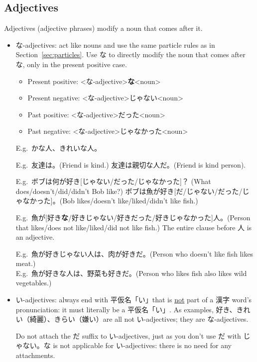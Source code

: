 \documentclass[../nihongo-gakushuu-kyouzai.tex]{subfiles}
\begin{document}
\subsection{Adjectives}
Adjectives (adjective phrases) modify a noun that comes after it.
\begin{itemize}
    \item な-adjectives: act like nouns and use the same particle rules as in Section~\ref{sec:particles}. Use な to directly modify the noun that comes after な, only in the present positive case.

    \begin{itemize}
        \item Present positive: <な-adjective>\textbf{な}<noun>
        \item Present negative: <な-adjective>じゃない<noun>
        \item Past positive: <な-adjective>だった<noun>
        \item Past negative: <な-adjective>じゃなかった<noun>
    \end{itemize}

    E.g.\ かな人、きれいな人。

    E.g.\ 友達は。(Friend is kind.) 友達は親切な人だ。(Friend is kind person).

    E.g.\ ボブは何が好き[じゃない/だった/じゃなかった]？ (What does/doesn't/did/didn't Bob like?) ボブは魚が好き[だ/じゃない/だった/じゃなかった]。(Bob likes/doesn't like/liked/didn't like fish.)

    E.g.\ 魚が[好き\textbf{な}/好きじゃない/好きだった/好きじゃなかった]人。(Person that likes/does not like/liked/did not like fish.) The entire clause before 人 is an adjective.

    E.g.\ 魚が好きじゃない人は、肉が好きだ。(Person who doesn't like fish likes meat.)\\
    E.g.\ 魚が好きな人は、野菜も好きだ。(Person who likes fish also likes wild vegetables.)

    \item い-adjectives: always end with 平仮名「い」that is \ul{not} part of a 漢字 word's pronunciation: it must literally be a 平仮名「い」. As examples, 好き、きれい（綺麗）、きらい（嫌い）are all not い-adjectives; they are な-adjectives.

    Do not attach the だ suffix to い-adjectives, just as you don't use だ with じゃない。な is not applicable for い-adjectives: there is no need for any attachments.


\end{itemize}
\end{document}
